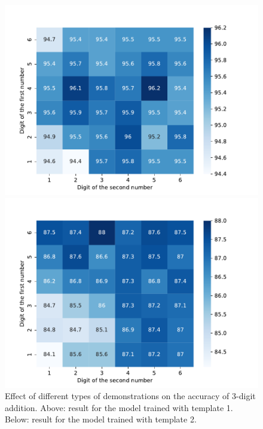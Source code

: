 \begin{figure}[!htb]
   \begin{minipage}{0.49\textwidth}
     \centering
     \includegraphics[width=.8\linewidth]{figs/gpt2-CLM-with-spaces-4e-DIFF-DIGITS.pdf}
   \end{minipage}\hfill
   \begin{minipage}{0.49\textwidth}
     \centering
     \includegraphics[width=.8\linewidth]{figs/gpt2-CLM-without-spaces-4e-DIFF-DIGITS.pdf}
   \end{minipage}
       \caption{Effect of different types of demonstrations on the accuracy of 3-digit addition. Above: result for the model trained with template 1. Below: result for the model trained with template 2.}\label{fig:diff-digits}
\end{figure}


